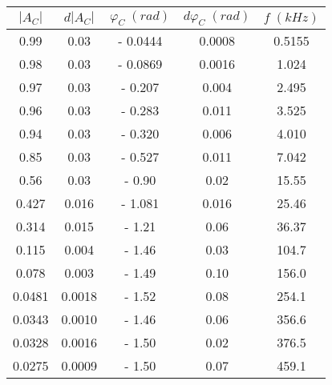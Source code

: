 \begin{tabular}{cc|cc|c}
\toprule
$|A_{C}|$ & $d|A_{C}|$ & $\varphi_{C} \; (rad)$ & $d\varphi_{C} \; (rad)$ & $f \; (kHz)$ \\
\midrule
     0.99 &       0.03 &                - 0.0444 &                  0.0008 &       0.5155 \\
     0.98 &       0.03 &                - 0.0869 &                  0.0016 &        1.024 \\
     0.97 &       0.03 &                -  0.207 &                   0.004 &        2.495 \\
     0.96 &       0.03 &                -  0.283 &                   0.011 &        3.525 \\
     0.94 &       0.03 &                -  0.320 &                   0.006 &        4.010 \\
     0.85 &       0.03 &                -  0.527 &                   0.011 &        7.042 \\
     0.56 &       0.03 &                -   0.90 &                    0.02 &        15.55 \\
    0.427 &      0.016 &                -  1.081 &                   0.016 &        25.46 \\
    0.314 &      0.015 &                -   1.21 &                    0.06 &        36.37 \\
    0.115 &      0.004 &                -   1.46 &                    0.03 &        104.7 \\
    0.078 &      0.003 &                -   1.49 &                    0.10 &        156.0 \\
   0.0481 &     0.0018 &                -   1.52 &                    0.08 &        254.1 \\
   0.0343 &     0.0010 &                -   1.46 &                    0.06 &        356.6 \\
   0.0328 &     0.0016 &                -   1.50 &                    0.02 &        376.5 \\
   0.0275 &     0.0009 &                -   1.50 &                    0.07 &        459.1 \\
\bottomrule
\end{tabular}

